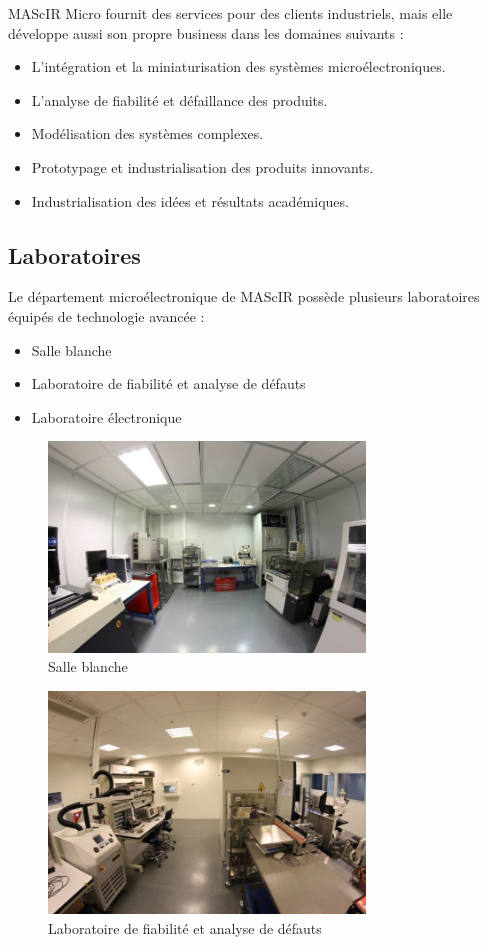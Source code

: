 \documentclass[11pt, a4paper, twoside]{book}
\begin{document}
MAScIR Micro fournit des services pour des clients industriels, mais elle développe aussi son propre business dans les domaines suivants :
\begin{itemize}
\item L’intégration et la miniaturisation des systèmes microélectroniques.
\item L’analyse de fiabilité et défaillance des produits.
\item Modélisation des systèmes complexes.
\item Prototypage et industrialisation des produits innovants.
\item Industrialisation des idées et résultats académiques.
\end{itemize}

\subsection{Laboratoires}
Le département microélectronique de MAScIR possède plusieurs laboratoires équipés de technologie avancée :
\begin{itemize}
\item Salle blanche
\item Laboratoire de fiabilité et analyse de défauts
\item Laboratoire électronique
\end{itemize}

\begin{figure}[H]
\centering
\includegraphics[width=0.75\textwidth]{cleanroom}
\caption{Salle blanche}
\end{figure}

\begin{figure}[H]
\centering
\includegraphics[width=0.75\textwidth]{labo}
\caption{Laboratoire de fiabilité et analyse de défauts}
\end{figure}
\end{document}
